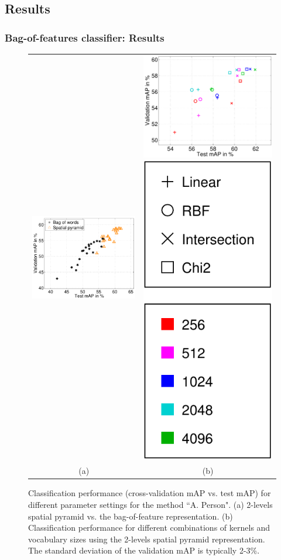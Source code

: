 \documentclass{beamer}
\begin{document}

\subsection{Results}
\begin{frame}
\frametitle{Bag-of-features classifier: Results}

\begin{figure}[tbp]
\centering \small
\begin{tabular}{cc}
\includegraphics[height=.3\linewidth]{figs/caseA_error_BOF_PYR.pdf} &
\includegraphics[height=.3\linewidth]{figs/caseA_error_PYR.pdf}
\includegraphics[height=.3\linewidth]{figs/legend.pdf}\\
(a) & (b)  \\
\end{tabular}
\caption{Classification performance (cross-validation mAP vs. test mAP) for different parameter settings for the method ``A. Person". (a) 2-levels spatial pyramid vs. the bag-of-feature representation.  (b) Classification performance for different combinations of kernels  and vocabulary sizes using the 2-levels spatial pyramid representation. The standard deviation of the validation mAP is typically 2-3\%.
}
 \label{fig:caseA}
\end{figure}

\end{frame}
\end{document}
